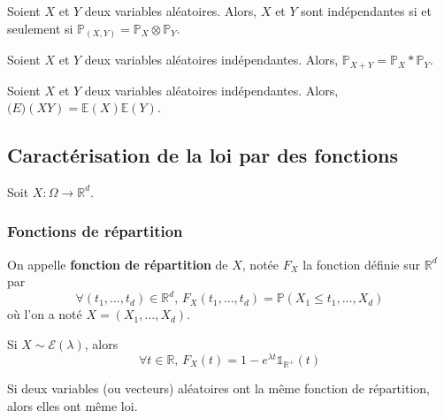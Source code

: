   \begin{theorem}
    Soient $X$ et $Y$ deux variables aléatoires. Alors, $X$ et $Y$ sont indépendantes si et seulement si $\mathbb{P}_{(X,Y)} = \mathbb{P}_X \otimes \mathbb{P}_Y$.
  \end{theorem}

  \begin{corollary}
    Soient $X$ et $Y$ deux variables aléatoires indépendantes. Alors, $\mathbb{P}_{X+Y} = \mathbb{P}_X * \mathbb{P}_Y$.
  \end{corollary}

  \begin{proposition}
    Soient $X$ et $Y$ deux variables aléatoires indépendantes. Alors, $\mathbb(E)(XY) = \mathbb{E}(X) \mathbb{E}(Y)$.
  \end{proposition}

  \subsection{Caractérisation de la loi par des fonctions}

  Soit $X : \Omega \rightarrow \mathbb{R}^d$.

  \subsubsection{Fonctions de répartition}


  \begin{definition}
    On appelle \textbf{fonction de répartition} de $X$, notée $F_X$ la fonction définie sur $\mathbb{R}^d$ par
    \[ \forall (t_1, \dots, t_d) \in \mathbb{R}^d, \, F_X(t_1, \dots, t_d) = \mathbb{P}(X_1 \leq t_1, \dots, X_d) \]
    où l'on a noté $X = (X_1, \dots, X_d)$.
  \end{definition}


  \begin{example}
    Si $X \sim \mathcal{E}(\lambda)$, alors
    \[ \forall t \in \mathbb{R}, \, F_X(t) = 1 - e^{\lambda t} \mathbb{1}_{\mathbb{R}^+}(t) \]
  \end{example}


  \begin{theorem}
    Si deux variables (ou vecteurs) aléatoires ont la même fonction de répartition, alors elles ont même loi.
  \end{theorem}

